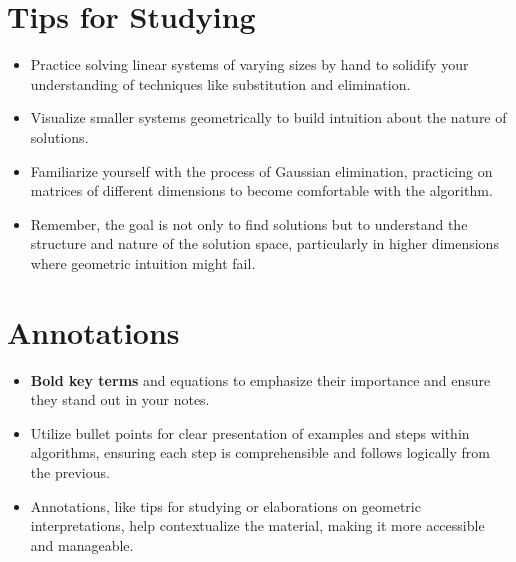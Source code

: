 \documentclass{article}
\begin{document}
\section{Tips for Studying}

\begin{itemize}
    \item Practice solving linear systems of varying sizes by hand to solidify your understanding of techniques like substitution and elimination.
    \item Visualize smaller systems geometrically to build intuition about the nature of solutions.
    \item Familiarize yourself with the process of Gaussian elimination, practicing on matrices of different dimensions to become comfortable with the algorithm.
    \item Remember, the goal is not only to find solutions but to understand the structure and nature of the solution space, particularly in higher dimensions where geometric intuition might fail.
\end{itemize}

\section{Annotations}

\begin{itemize}
    \item \textbf{Bold key terms} and equations to emphasize their importance and ensure they stand out in your notes.
    \item Utilize bullet points for clear presentation of examples and steps within algorithms, ensuring each step is comprehensible and follows logically from the previous.
    \item Annotations, like tips for studying or elaborations on geometric interpretations, help contextualize the material, making it more accessible and manageable.
\end{itemize}
\end{document}
